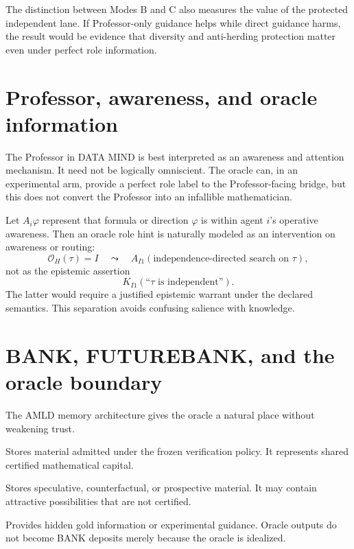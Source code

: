 \documentclass[11pt]{article}
\newcommand{\BANK}{\mathrm{BANK}}
\newcommand{\FBANK}{\mathrm{FUTUREBANK}}
\begin{document}
The distinction between Modes B and C also measures the value of the protected independent lane. If Professor-only guidance helps while direct guidance harms, the result would be evidence that diversity and anti-herding protection matter even under perfect role information.

\section{Professor, awareness, and oracle information}

The Professor in DATA MIND is best interpreted as an awareness and attention mechanism. It need not be logically omniscient. The oracle can, in an experimental arm, provide a perfect role label to the Professor-facing bridge, but this does not convert the Professor into an infallible mathematician.

Let $A_i\varphi$ represent that formula or direction $\varphi$ is within agent $i$'s operative awareness. Then an oracle role hint is naturally modeled as an intervention on awareness or routing:
\begin{equation}
\mathscr O_H(\tau)=I
\quad\leadsto\quad
A_{I1}(\text{independence-directed search on }\tau),
\end{equation}
not as the epistemic assertion
\begin{equation}
K_{I1}(\text{``$\tau$ is independent''}).
\end{equation}
The latter would require a justified epistemic warrant under the declared semantics. This separation avoids confusing salience with knowledge.

\section{BANK, FUTUREBANK, and the oracle boundary}

The AMLD memory architecture gives the oracle a natural place without weakening trust.

\begin{description}[leftmargin=2.1cm,style=nextline]
\item[$\BANK$] Stores material admitted under the frozen verification policy. It represents shared certified mathematical capital.
\item[$\FBANK$] Stores speculative, counterfactual, or prospective material. It may contain attractive possibilities that are not certified.
\item[Oracle] Provides hidden gold information or experimental guidance. Oracle outputs do not become BANK deposits merely because the oracle is idealized.
\end{description}
\end{document}
